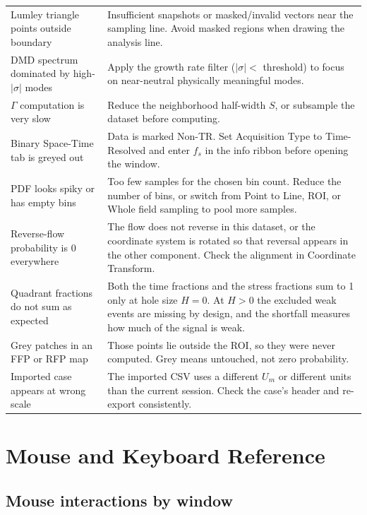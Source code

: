 \documentclass[11pt, a4paper]{report}
\begin{document}
\begin{table}[htbp]
\begin{tabular}{p{5.2cm}p{8.8cm}}
\addlinespace
Lumley triangle points outside boundary & Insufficient snapshots or masked/invalid vectors near the sampling line. Avoid masked regions when drawing the analysis line. \\
\addlinespace
DMD spectrum dominated by high-$|\sigma|$ modes & Apply the growth rate filter ($|\sigma| <$ threshold) to focus on near-neutral physically meaningful modes. \\
\addlinespace
$\Gamma$ computation is very slow & Reduce the neighborhood half-width $S$, or subsample the dataset before computing. \\
\addlinespace
Binary Space-Time tab is greyed out & Data is marked Non-TR. Set Acquisition Type to Time-Resolved and enter $f_s$ in the info ribbon before opening the window. \\
\addlinespace
PDF looks spiky or has empty bins & Too few samples for the chosen bin count. Reduce the number of bins, or switch from Point to Line, ROI, or Whole field sampling to pool more samples. \\
\addlinespace
Reverse-flow probability is 0 everywhere & The flow does not reverse in this dataset, or the coordinate system is rotated so that reversal appears in the other component. Check the alignment in Coordinate Transform. \\
\addlinespace
Quadrant fractions do not sum as expected & Both the time fractions and the stress fractions sum to 1 only at hole size $H = 0$. At $H > 0$ the excluded weak events are missing by design, and the shortfall measures how much of the signal is weak. \\
\addlinespace
Grey patches in an FFP or RFP map & Those points lie outside the ROI, so they were never computed. Grey means untouched, not zero probability. \\
\addlinespace
Imported case appears at wrong scale & The imported CSV uses a different $U_m$ or different units than the current session. Check the case's header and re-export consistently. \\
\bottomrule
\end{tabular}
\end{table}

\chapter{Mouse and Keyboard Reference}

\section{Mouse interactions by window}
\end{document}
